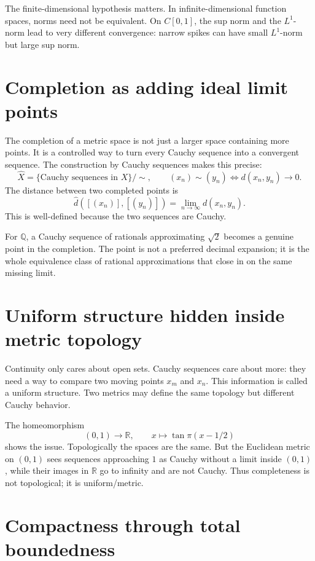 \begin{remark}
The finite-dimensional hypothesis matters.  In infinite-dimensional function spaces, norms need not be equivalent.  On \(C[0,1]\), the sup norm and the \(L^1\)-norm lead to very different convergence: narrow spikes can have small \(L^1\)-norm but large sup norm.
\end{remark}

\section{Completion as adding ideal limit points}

The completion of a metric space is not just a larger space containing more points.  It is a controlled way to turn every Cauchy sequence into a convergent sequence.  The construction by Cauchy sequences makes this precise:
\[
  \widehat X=\{\text{Cauchy sequences in }X\}/\sim,\qquad
  (x_n)\sim(y_n)\iff d(x_n,y_n)\to0.
\]
The distance between two completed points is
\[
  \widehat d([(x_n)],[(y_n)])=\lim_{n\to\infty}d(x_n,y_n).
\]
This is well-defined because the two sequences are Cauchy.

For \(\mathbb Q\), a Cauchy sequence of rationals approximating \(\sqrt2\) becomes a genuine point in the completion.  The point is not a preferred decimal expansion; it is the whole equivalence class of rational approximations that close in on the same missing limit.

\section{Uniform structure hidden inside metric topology}

Continuity only cares about open sets.  Cauchy sequences care about more: they need a way to compare two moving points \(x_m\) and \(x_n\).  This information is called a uniform structure.  Two metrics may define the same topology but different Cauchy behavior.

The homeomorphism
\[
  (0,1)\to \mathbb R,\qquad x\mapsto \tan \pi(x-1/2)
\]
shows the issue.  Topologically the spaces are the same.  But the Euclidean metric on \((0,1)\) sees sequences approaching \(1\) as Cauchy without a limit inside \((0,1)\), while their images in \(\mathbb R\) go to infinity and are not Cauchy.  Thus completeness is not topological; it is uniform/metric.

\section{Compactness through total boundedness}

